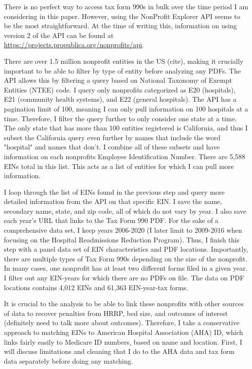 \documentclass[12pt]{article}
\begin{document}
    There is no perfect way to access tax form 990s in bulk over the time period I am considering in this paper. However, using the NonProfit Explorer API seems to be the most straightforward. At the time of writing this, information on using version 2 of the API can be found at \hyperlink{https://projects.propublica.org/nonprofits/api}{https://projects.propublica.org/nonprofits/api}. 
    
    There are over 1.5 million nonprofit entities in the US (cite), making it crucially important to be able to filter by type of entity before analyzing any PDFs. The API allows this by filtering a query based on National Taxonomy of Exempt Entities (NTEE) code. I query only nonprofits categorized as E20 (hospitals), E21 (community health systems), and E22 (general hospitals). The API has a pagination limit of 100, meaning I can only pull information on 100 hospitals at a time. Therefore, I filter the query further to only consider one state at a time. The only state that has more than 100 entities registered is California, and thus I subset the California query even further by names that include the word "hospital" and names that don't. I combine all of these subsets and have information on each nonprofits Employee Identification Number. There are 5,588 EINs total in this list. This acts as a list of entities for which I can pull more information. 

    I loop through the list of EINs found in the previous step and query more detailed information from the API on that specific EIN. I save the name, secondary name, state, and zip code, all of which do not vary by year. I also save each year's URL that links to the Tax Form 990 PDF. For the sake of a comprehensive data set, I keep years 2006-2020 (I later limit to 2009-2016 when focusing on the Hospital Readmissions Reduction Program). Thus, I finish this step with a panel data set of EIN characteristics and PDF locations. Importantly, there are multiple types of Tax Form 990s depending on the size of the nonprofit. In many cases, one nonprofit has at least two different forms filed in a given year. I filter out any EIN-years for which there are no PDFs on file. The data on PDF locations contains 4,012 EINs and 61,363 EIN-year-tax forms.

    It is crucial to the analysis to be able to link these nonprofits with other sources of data to recover penalties from HRRP, bed size, and outcomes of interest (definitely need to talk more about outcomes). Therefore, I take a conservative approach to matching EINs to American Hospital Association (AHA) ID, which links fairly easily to Medicare ID numbers, based on name and location. First, I will discuss limitations and cleaning that I do to the AHA data and tax form data separately before doing any matching. 
\end{document}
